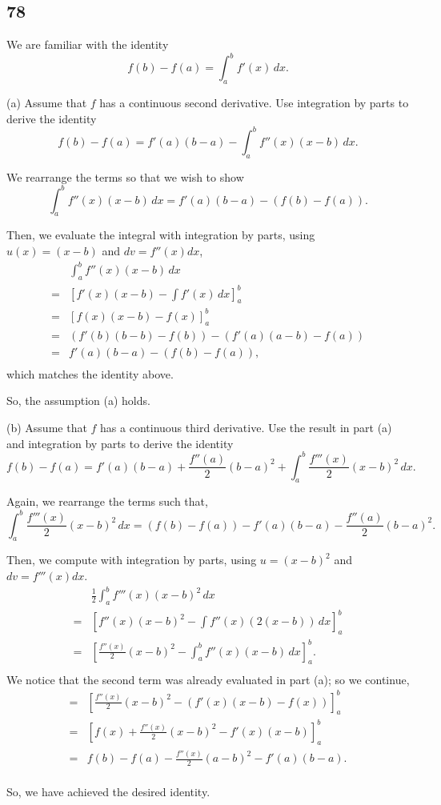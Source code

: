 \documentclass[../hw8]{subfiles}
\begin{document}
\subsection*{78}
We are familiar with the identity
\[f(b)-f(a)=\int_{a}^{b}f'(x)\,dx.\]

(a) Assume that $f$ has a continuous second derivative. 
Use integration by parts to derive the identity
\[f(b)-f(a)=f'(a)(b-a)-\int_{a}^{b}f''(x)(x-b)\,dx.\]

We rearrange the terms so that we wish to show
\[\int_{a}^{b}f''(x)(x-b)\,dx = f'(a)(b-a)-\left( f(b)-f(a) \right).\]

Then, we evaluate the integral with integration by parts, using $u(x)=(x-b)$ and $dv=f''(x)dx$,
\begin{align*}
    &\int_{a}^{b}f''(x)(x-b)\,dx \\
    =& {\left[ f'(x)(x-b) - \int f'(x)\,dx \right]}_{a}^{b} \\
    =& {\left[ f(x)(x-b) - f(x) \right]}_{a}^{b} \\
    =& \left( f'(b)(b-b)-f(b) \right)-\left( f'(a)(a-b)-f(a) \right) \\
    =& f'(a)(b-a)-\left( f(b)-f(a) \right), \\
\end{align*}
which matches the identity above.

So, the assumption (a) holds.


(b) Assume that $f$ has a continuous third derivative. 
Use the result in part (a) and integration by parts to derive the identity
\[f(b)-f(a)=f'(a)(b-a)+\frac{f''(a)}{2}{(b-a)}^2+\int_{a}^{b}\frac{f'''(x)}{2}{(x-b)}^2\,dx.\]

Again, we rearrange the terms such that,
\[\int_{a}^{b}\frac{f'''(x)}{2}{(x-b)}^2\,dx=\left(f(b)-f(a)\right)-f'(a)(b-a)-\frac{f''(a)}{2}{(b-a)}^2.\]

Then, we compute with integration by parts, using $u={(x-b)}^2$ and $dv=f'''(x)dx$.
\begin{align*}
    &\frac{1}{2}\int_{a}^{b}f'''(x){(x-b)}^2\,dx \\
    =& {\left[ f''(x){(x-b)}^2 - \int f''(x)(2(x-b))\,dx \right]}_{a}^{b} \\
    =& {\left[ \frac{f''(x)}{2}{(x-b)}^2 -\int_{a}^{b}f''(x)(x-b)\,dx \right]}_{a}^{b}. \\
\end{align*}
We notice that the second term was already evaluated in part (a); so we continue,
\begin{align*}
    =& {\left[ \frac{f''(x)}{2}{(x-b)}^2 - (f'(x)(x-b)-f(x)) \right]}_{a}^{b} \\
    =& {\left[ f(x) + \frac{f''(x)}{2}{(x-b)}^2 - f'(x)(x-b)\right]}_{a}^{b} \\
    =& f(b)-f(a)-\frac{f''(x)}{2}{(a-b)}^2-f'(a)(b-a). \\
\end{align*}

So, we have achieved the desired identity.
 
\end{document}
